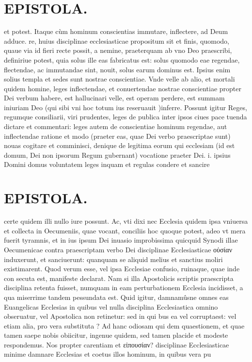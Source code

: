 \documentclass{article}
\begin{document}
\begin{pages}
\section*{EPISTOLA. }\pstart et potest. Itaque cùm hominum conscientias immutare, inflectere, ad Deum adduce. re, huius disciplinae ecclesiasticae propositum sit et finis, quomodo, quaue via id fieri recte possit, a nemine, praeterquam ab vno Deo praescribi, definiriue potest, quia solus ille eas fabricatus est: solus quomodo eae regendae, flectendae, ac immutandae sint, nouit, solus earum dominus est. Ipsius enim solius templa et sedes sunt nostrae conscientiae. Vnde velle ab alio, et mortali quidem homine, leges inflectendae, et conuertendae nostrae conscientiae propter Dei verbum habere, est hallucinari velle, est operam perdere, est summam iniuriam Deo (qui sibi vni hoc totum ius reseruauit )inferre. Possunt igitur Reges, regumque consiliarii, viri prudentes, leges de publica inter ipsos ciues pace tuenda dictare et commentari: leges autem de conscientiae hominum regendae, aut inflectendae ratione et modo (praeter eas, quae Dei verbo praescriptae sunt) nouas cogitare et comminisci, denique de legitima eorum qui ecclesiam (id est domum, Dei non ipsorum Regum gubernant) vocatione praeter Dei. i. ipsius Domini domus voluntatem leges inquam et regulas condere et sancire  \pend
\section*{EPISTOLA. }\pstart certe quidem illi nullo iure possunt. Ac, vti dixi nec Ecclesia quidem ipsa vniuersa et collecta in Oecumeniis, quae vocant, conciliis hoc quoque potest, adeo vt mera fuerit tyramnis, et in ius ipsum Dei inuasio improbissima quicquid Synodi illae Oecumenicae contra praescriptam verbo Dei disciplinae Ecclesiasticae οὐσίαν induxerunt, et sanciuerunt: quanquam se aliquid melius et sanctius moliri existimarent. Quod verum esse, vel ipsa Ecclesiae confusio, ruinaque, quae inde con secuta est, manifeste declarat. Nam si illa Apostolicis scriptis praescripta disciplina retenta fuisset, numquam in eam perturbationem Ecclesia incidisset, a qua miserrime tandem pessundata est. Quid igitur, damnamûsne omnes eas Euangelicas Ecclesias in quibus vel nulla disciplina Ecclesiastica omnino obseruatur, vel Apostolica non retinetur: sed in qui bus ea vel corruptaest: vel etiam alia, pro vera substituta ? Ad hanc odiosam qui dem quaestionem, et quae tamen saepe nobis obiicitur, ingenue quidem, sed tamen placide et modeste respondemus. Nos propter carentiam et εἰπουσίαν? disciplinae Ecclesiasticae minime damnare Ecclesias et coetus illos hominum, in quibus vera pu\pend

\end{pages}
\end{document}
